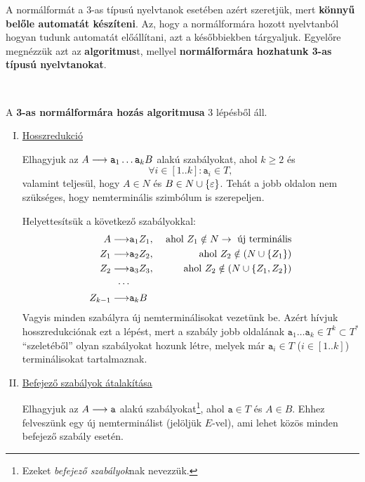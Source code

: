 A normálformát a 3-as típusú nyelvtanok esetében azért szeretjük, mert \textbf{könnyű belőle automatát készíteni}. Az, hogy a normálformára hozott nyelvtanból hogyan tudunk automatát előállítani, azt a későbbiekben tárgyaljuk. Egyelőre megnézzük azt az \textbf{algoritmus}t, mellyel \textbf{normálformára hozhatunk  3-as típusú nyelvtanokat}.

~\\[-2em]

\begin{mdframed}

A \textbf{3-as normálformára hozás algoritmusa} 3 lépésből áll.

\begin{enumerate}[I.]
	\item \underline{Hosszredukció}
	
	Elhagyjuk az $A \longrightarrow \texttt{a}_1 \dots \texttt{a}_k B$ alakú szabályokat, ahol $k \geq 2$ és \[ \forall i  \in [1..k] : \texttt{a}_i \in T, \] valamint teljesül, hogy $A \in N$ és $B \in N \cup \{\varepsilon\}$. Tehát a jobb oldalon nem szükséges, hogy nemterminális szimbólum is szerepeljen.
	
	Helyettesítsük a következő szabályokkal:
	\begin{align*}
		\prodrule{A}&{\texttt{a}_1 Z_1}, & \text{ ahol } Z_1 \notin N \to \text{ új terminális} \\
		\prodrule{Z_1}&{\texttt{a}_2 Z_2}, & \text{ ahol } Z_2 \notin (N \cup \{Z_1\}) \\
		\prodrule{Z_2}&{\texttt{a}_3 Z_3}, & \text{ ahol } Z_2 \notin (N \cup \{Z_1, Z_2\}) \\
		\cdots \\
		\prodrule{Z_{k-1}}&{\texttt{a}_k B}
	\end{align*}
	Vagyis minden szabályra új nemterminálisokat vezetünk be. Azért hívjuk hosszredukciónak ezt a lépést, mert a szabály jobb oldalának $\texttt{a}_1 \dots \texttt{a}_k \in T^k \subset T^*$ ``szeletéből'' olyan szabályokat hozunk létre, melyek már $\texttt{a}_i \in T$ ($i \in [1..k]$) terminálisokat tartalmaznak.
	
	\item \underline{Befejező szabályok átalakítása}
	
	Elhagyjuk az $A \longrightarrow \texttt{a}$ alakú szabályokat\footnote{Ezeket \textit{befejező szabályok}nak nevezzük.}, ahol $\texttt{a} \in T$ és $A \in B$. Ehhez felveszünk egy új nemterminálist (jelöljük $E$-vel), ami lehet közös minden befejező szabály esetén.
	

\end{enumerate}
\end{mdframed}

